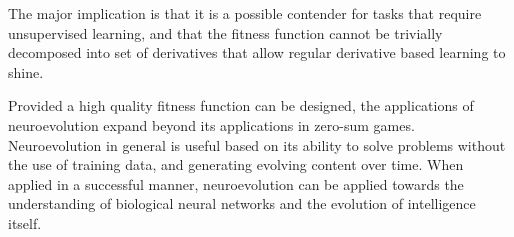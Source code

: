 \documentclass[12pt,a4paper]{article}
\begin{document}
    The major implication is that it is a possible contender for tasks that require unsupervised learning, and that the fitness function cannot be trivially decomposed into set of derivatives that allow regular derivative based learning to shine.
    
    Provided a high quality fitness function can be designed, the applications of neuroevolution expand beyond its applications in zero-sum games. Neuroevolution in general is useful based on its ability to solve problems without the use of training data, and generating evolving content over time. When applied in a successful manner, neuroevolution can be applied towards the understanding of biological neural networks and the evolution of intelligence itself.


\end{document}
